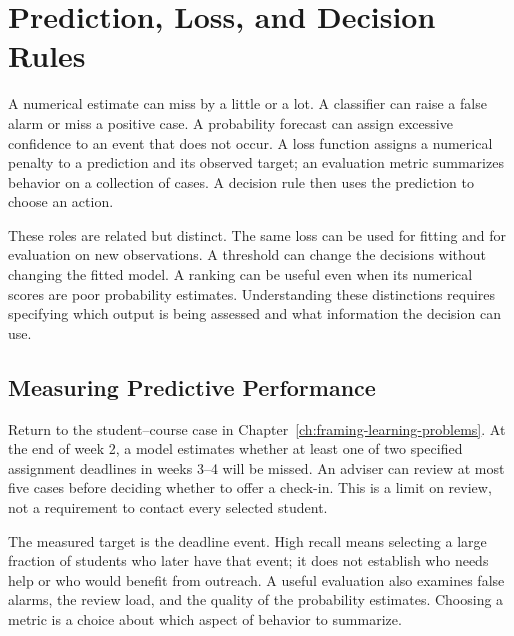 \begingroup
\raggedbottom
{}
\chapter{Prediction, Loss, and Decision Rules}
\label{ch:prediction-loss-decision}

A numerical estimate can miss by a little or a lot. A classifier can raise a false alarm or miss a positive case. A probability forecast can assign excessive confidence to an event that does not occur. A loss function assigns a numerical penalty to a prediction and its observed target; an evaluation metric summarizes behavior on a collection of cases. A decision rule then uses the prediction to choose an action.

These roles are related but distinct. The same loss can be used for fitting and for evaluation on new observations. A threshold can change the decisions without changing the fitted model. A ranking can be useful even when its numerical scores are poor probability estimates. Understanding these distinctions requires specifying which output is being assessed and what information the decision can use.

\section{Measuring Predictive Performance}

Return to the student--course case in Chapter~\ref{ch:framing-learning-problems}. At the end of week 2, a model estimates whether at least one of two specified assignment deadlines in weeks 3--4 will be missed. An adviser can review at most five cases before deciding whether to offer a check-in. This is a limit on review, not a requirement to contact every selected student.

The measured target is the deadline event. High recall means selecting a large fraction of students who later have that event; it does not establish who needs help or who would benefit from outreach. A useful evaluation also examines false alarms, the review load, and the quality of the probability estimates. Choosing a metric is a choice about which aspect of behavior to summarize.

